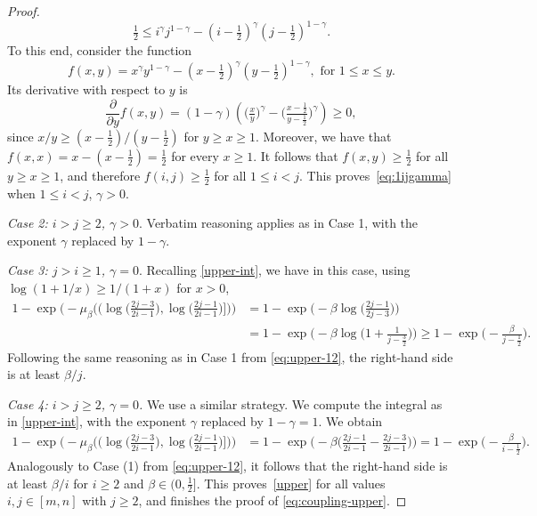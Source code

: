 \documentclass[10pt,a4paper]{amsart}
\begin{document}
\begin{proof}
\begin{equation}
    \tfrac12 \le i^\gamma j^{1-\gamma}- (i-\tfrac12 )^{\gamma} (j-\tfrac12 )^{1-\gamma}.
    \end{equation}
    To this end, consider the function 
    $$
    f(x,y) = x^\gamma y^{1-\gamma} - (x-\tfrac12 )^\gamma(y-\tfrac12 )^{1-\gamma}, 
    \text{ for $1\le x\le y$.}  $$
    Its derivative with respect to $y$ is
    \[
    \frac{\partial}{\partial y}f(x,y) = (1-\gamma)\left(\big(\tfrac x y\big)^\gamma - \big(\tfrac{x-\frac12 }{y-\frac12 }\big)^{\gamma}\right) \ge 0,   
    \]
    since $x/y \ge (x-\tfrac12 )/(y-\tfrac12 )$ for $y\ge x\ge 1$. Moreover, we have that
    $
    f(x,x) = x - (x-\tfrac12 ) = \tfrac12 
    $
    for every $x\ge 1$.
    It follows that $f(x,y) \ge \tfrac12 $ for all $y\ge x\ge 1$, and therefore $f(i,j) \ge \tfrac{1}{2}$ for all $1\le i<j$. This proves~\eqref{eq:1ijgamma} when $1\le i<j$, $\gamma>0$.

    \smallskip 
    \noindent\emph{Case 2: $i\!>\!j\ge\! 2$, $\gamma>0$}. Verbatim reasoning applies as in Case 1, with the exponent  $\gamma$ replaced by $1\!-\!\gamma$.

    
    \smallskip 
    \noindent\emph{Case 3: $j>i\ge 1$, $\gamma=0$}. Recalling \eqref{upper-int}, we have in this case, using $\log(1+1/x)\ge 1/(1+x)$ for $x>0$,
    \begin{align*}
    1-\exp\Big(-\mu_\beta \Big( (\log \big(\tfrac{2j-3}{2i-1}\big), \log \big(\tfrac{2j-1}{2i-1}\big) \big]\Big)\Big)
    &= 1-\exp\Big(-\beta\log\big(\tfrac{2j-1}{2j-3}\big)\Big) \\
    &= 1-\exp\Big(-\beta\log\big(1+\tfrac{1}{j-\frac32}\big)\Big) 
    \ge 1-\exp\Big(-\tfrac{\beta}{j-\frac12 }\Big).
    \end{align*}
    Following the same reasoning as in Case 1 from \eqref{eq:upper-12}, the right-hand side is at least $\beta/j$.
    
    \smallskip 
    \noindent\emph{Case 4: $i>j\ge 2$, $\gamma=0$.}
    We use a similar strategy. We compute the integral as in \eqref{upper-int}, with the exponent $\gamma$ replaced by $1-\gamma=1$. We obtain
    \begin{align*}
    1-\exp\Big(-\mu_\beta \Big( (\log \big(\tfrac{2j-3}{2i-1}\big), \log \big(\tfrac{2j-1}{2i-1}\big) \big]\Big)\Big)
    &= 1-\exp\Big(-\beta \big(\tfrac{2j-1}{2i-1}-\tfrac{2j-3}{2i-1}\big)\Big) = 1-\exp\big(-\tfrac{\beta}{i-\frac12 }\big).
    \end{align*}
    Analogously to Case (1) from \eqref{eq:upper-12}, it follows that the right-hand side is at least $\beta/i$ for $i\ge 2$ and $\beta\in(0, \tfrac12 ]$.    This proves~\eqref{upper} for all values $i,j\in[m,n]$ with $j\ge 2$, and finishes the proof of \eqref{eq:coupling-upper}. 
\end{proof}
\end{document}
